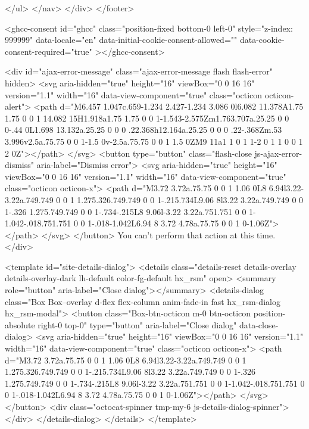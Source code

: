 {{{{{{{      </ul>
    </nav>
  </div>
</footer>



    <ghcc-consent id="ghcc" class="position-fixed bottom-0 left-0" style="z-index: 999999"
      data-locale="en"
      data-initial-cookie-consent-allowed=""
      data-cookie-consent-required="true"
    ></ghcc-consent>




  <div id="ajax-error-message" class="ajax-error-message flash flash-error" hidden>
    <svg aria-hidden="true" height="16" viewBox="0 0 16 16" version="1.1" width="16" data-view-component="true" class="octicon octicon-alert">
    <path d="M6.457 1.047c.659-1.234 2.427-1.234 3.086 0l6.082 11.378A1.75 1.75 0 0 1 14.082 15H1.918a1.75 1.75 0 0 1-1.543-2.575Zm1.763.707a.25.25 0 0 0-.44 0L1.698 13.132a.25.25 0 0 0 .22.368h12.164a.25.25 0 0 0 .22-.368Zm.53 3.996v2.5a.75.75 0 0 1-1.5 0v-2.5a.75.75 0 0 1 1.5 0ZM9 11a1 1 0 1 1-2 0 1 1 0 0 1 2 0Z"></path>
</svg>
    <button type="button" class="flash-close js-ajax-error-dismiss" aria-label="Dismiss error">
      <svg aria-hidden="true" height="16" viewBox="0 0 16 16" version="1.1" width="16" data-view-component="true" class="octicon octicon-x">
    <path d="M3.72 3.72a.75.75 0 0 1 1.06 0L8 6.94l3.22-3.22a.749.749 0 0 1 1.275.326.749.749 0 0 1-.215.734L9.06 8l3.22 3.22a.749.749 0 0 1-.326 1.275.749.749 0 0 1-.734-.215L8 9.06l-3.22 3.22a.751.751 0 0 1-1.042-.018.751.751 0 0 1-.018-1.042L6.94 8 3.72 4.78a.75.75 0 0 1 0-1.06Z"></path>
</svg>
    </button>
    You can’t perform that action at this time.
  </div>

    <template id="site-details-dialog">
  <details class="details-reset details-overlay details-overlay-dark lh-default color-fg-default hx_rsm" open>
    <summary role="button" aria-label="Close dialog"></summary>
    <details-dialog class="Box Box--overlay d-flex flex-column anim-fade-in fast hx_rsm-dialog hx_rsm-modal">
      <button class="Box-btn-octicon m-0 btn-octicon position-absolute right-0 top-0" type="button" aria-label="Close dialog" data-close-dialog>
        <svg aria-hidden="true" height="16" viewBox="0 0 16 16" version="1.1" width="16" data-view-component="true" class="octicon octicon-x">
    <path d="M3.72 3.72a.75.75 0 0 1 1.06 0L8 6.94l3.22-3.22a.749.749 0 0 1 1.275.326.749.749 0 0 1-.215.734L9.06 8l3.22 3.22a.749.749 0 0 1-.326 1.275.749.749 0 0 1-.734-.215L8 9.06l-3.22 3.22a.751.751 0 0 1-1.042-.018.751.751 0 0 1-.018-1.042L6.94 8 3.72 4.78a.75.75 0 0 1 0-1.06Z"></path>
</svg>
      </button>
      <div class="octocat-spinner tmp-my-6 js-details-dialog-spinner"></div>
    </details-dialog>
  </details>
</template>

}}}}}}}
